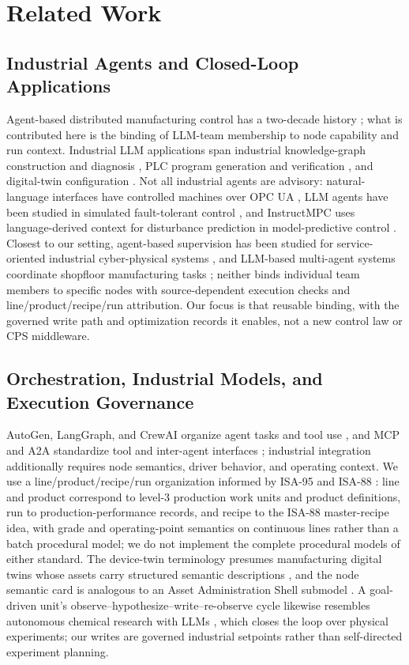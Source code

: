 \section{Related Work}
\subsection{Industrial Agents and Closed-Loop Applications}
Agent-based distributed manufacturing control has a two-decade history
\cite{leitao2009agentbased}; what is contributed here is the binding of LLM-team
membership to node capability and run context. Industrial LLM applications span
industrial knowledge-graph construction \cite{zhang2026comaikg} and diagnosis
\cite{liu2024kgdiag}, PLC program generation and verification
\cite{liu2026agents4plc,fakih2024llm4plc}, and digital-twin configuration
\cite{xia2024llmsim}. Not all industrial agents are advisory: natural-language interfaces have controlled machines over OPC UA \cite{hofmann2025nlc}, LLM
agents have been studied in simulated fault-tolerant control \cite{vyas2026ftc},
and InstructMPC uses language-derived context for disturbance prediction in
model-predictive control \cite{wu2025instructmpc}. Closest to our setting,
agent-based supervision has been studied for service-oriented industrial
cyber-physical systems \cite{biskupovic2025supervision}, and LLM-based multi-agent
systems coordinate shopfloor manufacturing tasks \cite{zhao2026shopfloor}; neither
binds individual team members to specific nodes with source-dependent execution
checks and line/product/recipe/run attribution. Our focus is that reusable binding,
with the governed write path and optimization records it enables, not a new control
law or CPS middleware.

\subsection{Orchestration, Industrial Models, and Execution Governance}
AutoGen, LangGraph, and CrewAI organize agent tasks and tool use
\cite{wu2023autogen,langgraph2024,crewai2024}, and MCP and A2A standardize tool and
inter-agent interfaces \cite{mcp2024,a2a2025}; industrial integration additionally
requires node semantics, driver behavior, and operating context. We use a
line/product/recipe/run organization informed by ISA-95 and ISA-88
\cite{isa95,isa88}: line and product correspond to level-3 production work units and
product definitions, run to production-performance records, and recipe to the ISA-88
master-recipe idea, with grade and operating-point semantics on continuous lines
rather than a batch procedural model; we do not implement the complete procedural
models of either standard. The device-twin terminology presumes manufacturing
digital twins whose assets carry structured semantic descriptions
\cite{nee2019digital}, and the node semantic card is analogous to an Asset
Administration Shell submodel \cite{iec63278}. A goal-driven unit's
observe--hypothesize--write--re-observe cycle likewise resembles autonomous chemical
research with LLMs \cite{boiko2023autonomous}, which closes the loop over physical
experiments; our writes are governed industrial setpoints rather than self-directed
experiment planning.

